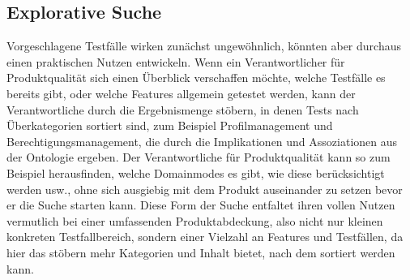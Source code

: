 \subsection*{Explorative Suche}
\glqq Vorgeschlagene\grqq{} Testfälle wirken zunächst ungewöhnlich, könnten aber durchaus einen praktischen Nutzen entwickeln. Wenn ein Verantwortlicher für Produktqualität sich einen Überblick verschaffen möchte, welche Testfälle es bereits gibt, oder welche Features allgemein getestet werden, kann der Verantwortliche durch die Ergebnismenge stöbern, in denen Tests nach Überkategorien sortiert sind, zum Beispiel Profilmanagement und Berechtigungsmanagement, die durch die Implikationen und Assoziationen aus der Ontologie ergeben. Der Verantwortliche für Produktqualität kann so zum Beispiel herausfinden, welche Domainmodes es gibt, wie diese berücksichtigt werden usw., ohne sich ausgiebig mit dem Produkt auseinander zu setzen bevor er die Suche starten kann. Diese Form der Suche entfaltet ihren vollen Nutzen vermutlich bei einer umfassenden Produktabdeckung, also nicht nur kleinen konkreten Testfallbereich, sondern einer Vielzahl an Features und Testfällen, da hier das \glqq stöbern\grqq{} mehr Kategorien und Inhalt bietet, nach dem sortiert werden kann.
